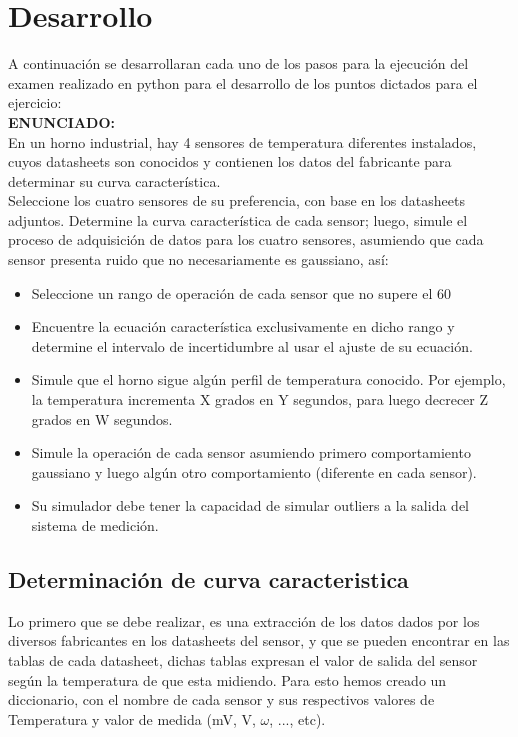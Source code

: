 \documentclass[conference]{IEEEtran}
\begin{document}
\section{Desarrollo}

A continuación se desarrollaran cada uno de los pasos para la ejecución del examen realizado en python para el desarrollo de los puntos dictados para el ejercicio:\\

\textbf{ENUNCIADO:}\\

En un horno industrial, hay 4 sensores de temperatura diferentes instalados, cuyos datasheets son conocidos y contienen los datos del fabricante para determinar su curva característica. \\

Seleccione los cuatro sensores de su preferencia, con base en los datasheets adjuntos. Determine la curva característica de cada sensor; luego, simule el proceso de adquisición de datos para los cuatro sensores, asumiendo que cada sensor presenta ruido que no necesariamente es gaussiano, así:\\

\begin{itemize}
	\item Seleccione un rango de operación de cada sensor que no supere el 60%
	\item Encuentre la ecuación característica exclusivamente en dicho rango y determine el intervalo de incertidumbre al usar el ajuste de su ecuación.
	\item Simule que el horno sigue algún perfil de temperatura conocido. Por ejemplo, la temperatura incrementa X grados en Y segundos, para luego decrecer Z grados en W segundos. 
	\item Simule la operación de cada sensor asumiendo primero comportamiento gaussiano y luego algún otro comportamiento (diferente en cada sensor).
	\item Su simulador debe tener la capacidad de simular outliers a la salida del sistema de medición. 
\end{itemize}


\subsection{Determinación de curva caracteristica}

Lo primero que se debe realizar, es una extracción de los datos dados por los diversos fabricantes en los datasheets del sensor, y que se pueden encontrar en las tablas de cada datasheet, dichas tablas expresan el valor de salida del sensor según la temperatura de que esta midiendo. Para esto hemos creado un diccionario, con el nombre de cada sensor y sus respectivos valores de Temperatura y valor de medida (mV, V, $\omega$, ..., etc).\\
\end{document}
